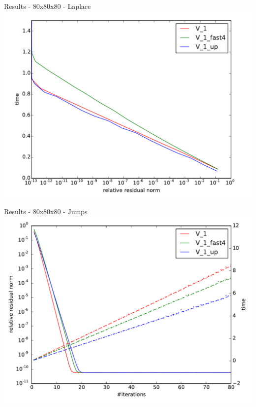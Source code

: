 \documentclass{beamer}
\begin{document}
\begin{frame}{Results - 80x80x80 - Laplace}
 \includegraphics[width=\linewidth]{AMG2006/test/DELL/laplace/time_convergence_fast.pdf}
\end{frame}
\begin{frame}{Results - 80x80x80 - Jumps}
 \includegraphics[width=\linewidth]{AMG2006/test/DELL/jumps/convergence_fast_10.pdf}
\end{frame}
\end{document}
